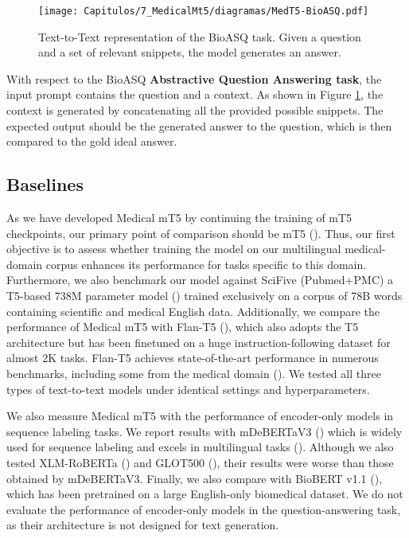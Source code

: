 \begin{figure}[htbp]
  \centering
  \texttt{[image: Capitulos/7\_MedicalMt5/diagramas/MedT5-BioASQ.pdf]}
  \caption{Text-to-Text representation of the BioASQ task. Given a question and a set of relevant snippets, the model generates an answer.}
  \label{fig:BioASQ}
\end{figure}

With respect to the BioASQ \textbf{Abstractive Question Answering task}, the input prompt contains the question and a context. As shown in Figure \ref{fig:BioASQ}, the context is generated by concatenating all the provided possible snippets. The expected output should be the generated answer to the question, which is then compared to the gold ideal answer. 

\subsection{Baselines}

As we have developed Medical mT5 by continuing the training of mT5 checkpoints, our primary point of comparison should be mT5 (\cite{mt5}). Thus, our first objective
is to assess whether training the model on our multilingual medical-domain
corpus enhances its performance for tasks specific to this domain. Furthermore, we also benchmark our model against SciFive (Pubmed+PMC) a T5-based 738M parameter model
(\cite{DBLP:journals/corr/abs-2106-03598}) trained exclusively on a corpus of 78B words containing scientific and medical English data. Additionally, we compare the performance of Medical mT5 with Flan-T5 (\cite{chung-flan-instruction-models}), which also adopts the T5 architecture but has been finetuned on a huge instruction-following dataset for almost 2K tasks. Flan-T5 achieves state-of-the-art performance in numerous benchmarks, including some from the medical domain (\cite{singhal-palm}). We tested all three types of text-to-text models under identical settings and hyperparameters.

We also measure Medical mT5 with the performance of encoder-only models in sequence labeling tasks. We report results with mDeBERTaV3 (\cite{DBLP:conf/iclr/HeLGC21/deberta}) which is widely used for sequence labeling and excels in multilingual tasks (\cite{adelani-etal-2022-masakhaner,Agerri2022LessonsLF}). Although we also tested XLM-RoBERTa (\cite{conneau-etal-2020-unsupervised}) and GLOT500 (\cite{DBLP:conf/acl/ImaniLKSSKMSMYS23}), their results were worse than those obtained by mDeBERTaV3. Finally, we also compare with BioBERT v1.1 (\cite{DBLP:journals/bioinformatics/LeeYKKKSK20}), which has been pretrained on a large English-only biomedical dataset. We do not evaluate the performance of encoder-only models in the question-answering task, as their architecture is not designed for text generation.


